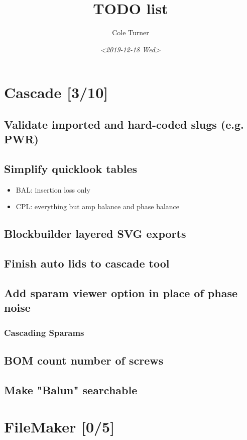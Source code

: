 \documentclass[11pt]{article}
\author{Cole Turner}
\date{\textit{<2019-12-18 Wed>}}
\title{TODO list}
\begin{document}
\maketitle
\section{Cascade [3/10]}
\label{sec:org7b6c003}
\subsection{Validate imported and hard-coded slugs (e.g. PWR)}
\label{sec:orgbe3d2b5}
\subsection{Simplify quicklook tables}
\label{sec:org40c438c}
\begin{itemize}
\item BAL: insertion loss only
\item CPL: everything but amp balance and phase balance
\end{itemize}
\subsection{Blockbuilder layered SVG exports}
\label{sec:org548db7d}
\subsection{Finish auto lids to cascade tool}
\label{sec:org2f868f6}
\subsection{Add sparam viewer option in place of phase noise}
\label{sec:orgc0d2f84}
\subsubsection{Cascading Sparams}
\label{sec:orged52fb7}
\subsection{BOM count number of screws}
\label{sec:orga1c3933}
\subsection{Make "Balun" searchable}
\label{sec:org6c412cb}
\section{FileMaker [0/5]}
\label{sec:orga446646}
\end{document}
